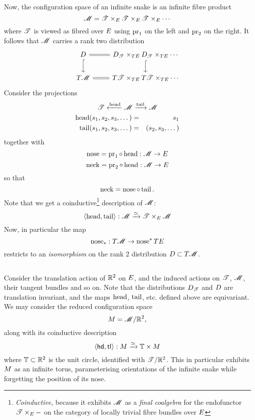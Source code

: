 \subsection{}
Now, the configuration space of an infinite snake is an infinite
fibre product
\[
    \M = \S \times_\E \S \times_\E \S \times_\E \cdots
\]
where $\S$ is viewed as fibred over $\E$ using $\pr_1$ on the left and $\pr_2$ 
on the right. It follows that $\M$ carries a rank two distribution
\[
\begin{tikzcd}
        \D \arrow[d,hookrightarrow] \arrow[r,equal] & \D_\S \times_{T\E} D_\S \times_{T\E} \cdots \arrow[d,hookrightarrow] \\
        T\M \arrow[r,equal] & T\S  \times_{T\E} T\S  \times_{T\E}\cdots
\end{tikzcd}
\]
Consider the projections
\[
     \S  \xleftarrow{\head} \M  \xrightarrow{\tail}  \M               
\]
\begin{eqnarray*}
        \head(s_1,s_2,s_3,\dots) &=& s_1 \\
        \tail(s_1,s_2,s_3,\dots) &=& (s_2,s_3,\dots)
\end{eqnarray*}
together with
\[      \nose = \pr_1 \circ \head : \M \to \E \]
\[      \neck = \pr_2 \circ \head : \M \to \E \]
so that
\[      \neck = \nose \circ \tail. \]
Note that we get a coinductive\footnote{
\emph{Coinductive,} because it exhibits $\M$ as a \emph{final coalgebra}
for the endofunctor $\S \times_\E -$ on the category of locally trivial fibre 
bundles over $\E$
}
description of $\M$:
\[
        \langle \head, \tail \rangle : \M \xrightarrow{\simeq} \S \times_\E \M
\]
Now, in particular the map
\[
    \nose_* : T\M \to \nose^* T\E
\]
restricts to an \emph{isomorphism} on the rank 2 distribution $\D \subset T\M$.

\subsection{}
Consider the translation action of $\RR^2$ on $\E$, and the induced actions
on $\S$, $\M$, their tangent bundles and so on. Note that the distributions
$\D_\S$ and $\D$ are translation invariant, and the maps $\head$, $\tail$, etc. 
defined above are equivariant. We may consider the reduced configuration
space 
\[
   \Mr = \M / \RR^2, 
\]
along with its coinductive description
\[
        \langle\hd, \tl\rangle : \Mr \xrightarrow{\simeq} \TT \times \Mr 
\]
where $\TT\subset\RR^2$ is the unit circle, identified with $\S/\RR^2$. This in particular
exhibits $\Mr$ as an infinite torus, parameterising orientations of the
infinite snake while forgetting the position of its nose.


